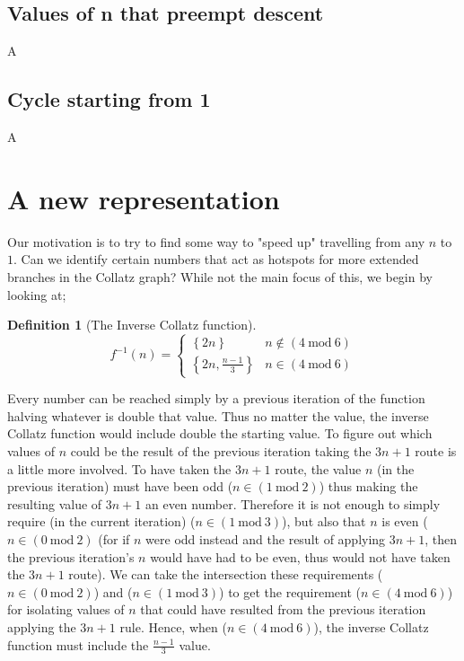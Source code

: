 \documentclass[12pt,a4paper]{amsart}
\numberwithin{equation}{section}
\theoremstyle{plain}
\theoremstyle{definition}
\newtheorem{Def}[Th]{Definition}
\begin{document}
\subsection{Values of n that preempt descent}

A

\subsection{Cycle starting from 1}

A

\section{A new representation}

Our motivation is to try to find some way to "speed up" travelling from any $n$ to $1$. Can we identify certain numbers that act as hotspots for more extended branches in the Collatz graph? While not the main focus of this, we begin by looking at;

\begin{Def}[The Inverse Collatz function]
\begin{equation}
f^{-1} \left ( n \right )=\left\{\begin{matrix}
\left \{ 2n \right \} & n \notin \left ( 4\:\mathrm{mod}\:6 \right ) \\ 
\left \{ 2n, \frac{n-1}{3} \right \} & n \in \left ( 4\:\mathrm{mod}\:6 \right )
\end{matrix}\right.
\end{equation}
\end{Def}

Every number can be reached simply by a previous iteration of the function halving whatever is double that value. Thus no matter the value, the inverse Collatz function would include double the starting value. To figure out which values of $n$ could be the result of the previous iteration taking the $3n+1$ route is a little more involved. To have taken the $3n+1$ route, the value $n$ (in the previous iteration) must have been odd ($n \in \left ( 1\:\mathrm{mod}\:2 \right )$) thus making the resulting value of $3n+1$ an even number. Therefore it is not enough to simply require (in the current iteration) ($n \in \left ( 1\:\mathrm{mod}\:3 \right )$), but also that $n$ is even ($n \in \left ( 0\:\mathrm{mod}\:2 \right )$ (for if $n$ were odd instead and the result of applying $3n+1$, then the previous iteration's $n$ would have had to be even, thus would not have taken the $3n+1$ route). We can take the intersection these requirements ($n \in \left ( 0\:\mathrm{mod}\:2 \right )$) and ($n \in \left ( 1\:\mathrm{mod}\:3 \right )$) to get the requirement ($n \in \left ( 4\:\mathrm{mod}\:6 \right )$) for isolating values of $n$ that could have resulted from the previous iteration applying the $3n+1$ rule. Hence, when ($n \in \left ( 4\:\mathrm{mod}\:6 \right )$), the inverse Collatz function must include the $\frac{n-1}{3}$ value.
\end{document}
